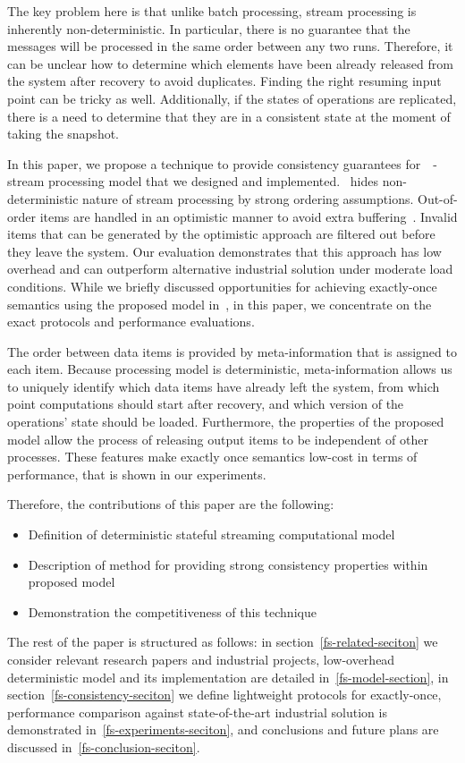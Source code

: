 The key problem here is that unlike batch processing, stream processing is inherently non-deterministic. In particular, there is no guarantee that the messages will be processed in the same order between any two runs. Therefore, it can be unclear how to determine which elements have been already released from the system after recovery to avoid duplicates. Finding the right resuming input point can be tricky as well. Additionally, if the states of operations are replicated, there is a need to determine that they are in a consistent state at the moment of taking the snapshot. 

In this paper, we propose a technique to provide consistency guarantees for~\FlameStream\ - stream processing model that we designed and implemented. \FlameStream\ hides non-deterministic nature of stream processing by strong ordering assumptions. Out-of-order items are handled in an optimistic manner to avoid extra buffering~\cite{we2018seim}. Invalid items that can be generated by the optimistic approach are filtered out before they leave the system. Our evaluation demonstrates that this approach has low overhead and can outperform alternative industrial solution under moderate load conditions. While we briefly discussed opportunities for achieving exactly-once semantics using the proposed model in~\cite{we2018beyondmr}, in this paper, we concentrate on the exact protocols and performance evaluations.

The order between data items is provided by meta-information that is assigned to each item. Because processing model is deterministic, meta-information allows us to uniquely identify which data items have already left the system, from which point computations should start after recovery, and which version of the operations' state should be loaded. Furthermore, the properties of the proposed model allow the process of releasing output items to be independent of other processes. These features make exactly once semantics low-cost in terms of performance, that is shown in our experiments. 

Therefore, the contributions of this paper are the following: 
\begin{itemize}
    \item Definition of deterministic stateful streaming computational model 
    \item Description of method for providing strong consistency properties within proposed model 
    \item Demonstration the competitiveness of this technique
\end{itemize}

The rest of the paper is structured as follows: in section~\ref{fs-related-seciton} we consider relevant research papers and industrial projects, low-overhead deterministic model and its implementation are detailed in~\ref{fs-model-section}, in section~\ref{fs-consistency-seciton} we define lightweight protocols for exactly-once, performance comparison against state-of-the-art industrial solution is demonstrated in~\ref{fs-experiments-seciton}, and conclusions and future plans are discussed in~\ref{fs-conclusion-seciton}.

